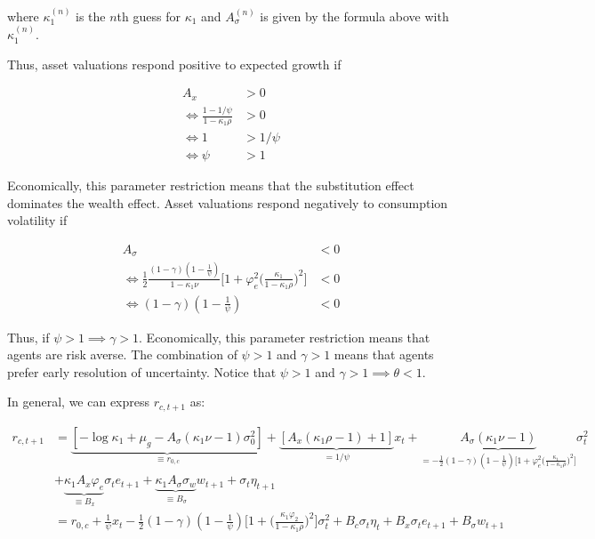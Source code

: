 \documentclass{article}
\begin{document}
\begin{enumerate}
where $\kappa_1^{(n)}$ is the $n$th guess for $\kappa_1$ and $A_\sigma^{(n)}$ is given by the formula above with $\kappa_1^{(n)}$.

Thus, asset valuations respond positive to expected growth if 

\begin{align*}
A_x &> 0 \\
\iff 
\frac{1 - 1/\psi}{1 - \kappa_1 \rho} &> 0 \\
\iff
1 &> 1/\psi \\
\iff
\psi &> 1
\end{align*}

Economically, this parameter restriction means that the substitution effect dominates the wealth effect.  Asset valuations respond negatively to consumption volatility if

\begin{align*}
A_\sigma &< 0 \\
\iff
\frac{1}{2}\frac{(1-\gamma)(1-\frac{1}{\psi})}{1-\kappa_1 \nu}\Bigg[1 + \varphi_e^2\Big(\frac{\kappa_1}{1-\kappa_1 \rho}\Big)^2\Bigg] &< 0 \\
\iff
(1-\gamma)(1-\frac{1}{\psi}) &< 0
\end{align*}

Thus, if $\psi > 1 \implies \gamma > 1$.  Economically, this parameter restriction means that agents are risk averse.  The combination of $\psi > 1$ and $\gamma > 1$ means that agents prefer early resolution of uncertainty. Notice that $\psi > 1$ and $\gamma > 1\implies \theta < 1$.  

\bigskip

In general, we can express $r_{c,t+1}$ as:

\begin{align*}
r_{c, t+1} 
&= \underbrace{[-\log \kappa_1 + \mu_g - A_\sigma(\kappa_1 \nu - 1) \sigma_0^2]}_{\equiv r_{0,c}} 
+ \underbrace{[A_x(\kappa_1  \rho - 1) + 1]}_{= 1/\psi} x_t
+ \underbrace{A_\sigma(\kappa_1 \nu - 1)}_{=-\frac{1}{2}(1-\gamma)(1-\frac{1}{\psi})\Bigg[1 + \varphi_e^2\Big(\frac{\kappa_1}{1-\kappa_1 \rho}\Big)^2\Bigg]}\sigma_t^2 \\
&+ \underbrace{\kappa_1 A_x \varphi_e}_{\equiv B_x} \sigma_t e_{t+1} 
+ \underbrace{\kappa_1 A_\sigma \sigma_w}_{\equiv B_\sigma} w_{t+1}
+ \sigma_t \eta_{t+1}\\
&= r_{0,c} + \frac{1}{\psi} x_t - \frac{1}{2}(1-\gamma)(1-\frac{1}{\psi}) \Bigg[1 + \Big(\frac{\kappa_1 \varphi_2}{1 - \kappa_1 \rho}\Big)^2 \Bigg]\sigma_t^2 + B_c \sigma_t \eta_t + B_x \sigma_t e_{t+1} + B_\sigma w_{t+1}
\end{align*}


\end{enumerate}
\end{document}
